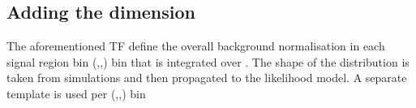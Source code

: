 %


\subsection{Adding the \mht dimension}

The aforementioned TF define the overall background normalisation in each signal region bin (\njet,\nb,\HT) bin that is
integrated over \mht. The shape of the \mht distribution is taken from simulations and then propagated to the likelihood model. 
A separate \mht template is used per (\njet,\nb,\HT) bin


